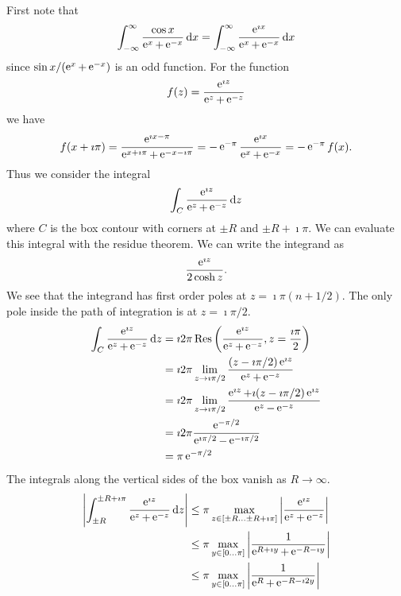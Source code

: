 {%
\begin{Solution}
  \label{solution cos x / (e x + e -x)}
  First note that 
  \[
  \int_{-\infty}^\infty \frac{\cos x}{\mathop{\mathrm{e}}\nolimits^x + \mathop{\mathrm{e}}\nolimits^{-x} } \,\mathrm{d} x 
  = \int_{-\infty}^\infty \frac{ \mathop{\mathrm{e}}\nolimits^{\imath x} }{\mathop{\mathrm{e}}\nolimits^x + \mathop{\mathrm{e}}\nolimits^{-x} } \,\mathrm{d} x
  \]
  since $\sin x / (\mathop{\mathrm{e}}\nolimits^x + \mathop{\mathrm{e}}\nolimits^{-x})$ is an odd function.  For the function
  \[
  f(z) = \frac{ \mathop{\mathrm{e}}\nolimits^{\imath z} }{ \mathop{\mathrm{e}}\nolimits^{z} + \mathop{\mathrm{e}}\nolimits^{-z} }
  \]
  we have
  \[
  f(x + \imath \pi) = \frac{ \mathop{\mathrm{e}}\nolimits^{\imath x - \pi} }{ \mathop{\mathrm{e}}\nolimits^{x + \imath \pi} + \mathop{\mathrm{e}}\nolimits^{-x - \imath \pi} }
  = - \mathop{\mathrm{e}}\nolimits^{- \pi} \frac{ \mathop{\mathrm{e}}\nolimits^{\imath x} }{ \mathop{\mathrm{e}}\nolimits^x + \mathop{\mathrm{e}}\nolimits^{-x} }
  = - \mathop{\mathrm{e}}\nolimits^{- \pi} f(x).
  \]
  Thus we consider the integral
  \[
  \int_C \frac{ \mathop{\mathrm{e}}\nolimits^{\imath z} }{ \mathop{\mathrm{e}}\nolimits^{z} + \mathop{\mathrm{e}}\nolimits^{-z} } \,\mathrm{d} z
  \]
  where $C$ is the box contour with corners at $\pm R$ and $\pm R + \imath \pi$.
  We can evaluate this integral with the residue theorem.
  We can write the integrand as
  \[
  \frac{ \mathop{\mathrm{e}}\nolimits^{\imath z} }{ 2 \cosh z }.
  \]
  We see that the integrand has first order poles at $z = \imath \pi (n + 1/2)$. 
  The only pole inside the path of integration is at $z = \imath \pi / 2$.
  \begin{align*}
    \int_C \frac{ \mathop{\mathrm{e}}\nolimits^{\imath z} }{ \mathop{\mathrm{e}}\nolimits^{z} + \mathop{\mathrm{e}}\nolimits^{-z} } \,\mathrm{d} z
    &= \imath 2 \pi \mathop{\mathrm{Res}}\nolimits \left( \frac{ \mathop{\mathrm{e}}\nolimits^{\imath z} }{ \mathop{\mathrm{e}}\nolimits^{z} + \mathop{\mathrm{e}}\nolimits^{-z} },
      z = \frac{ \imath \pi }{ 2 } \right) \\
    &= \imath 2 \pi \lim_{z \to \imath \pi / 2}
    \frac{ (z - \imath \pi / 2) \mathop{\mathrm{e}}\nolimits^{\imath z} }{ \mathop{\mathrm{e}}\nolimits^{z} + \mathop{\mathrm{e}}\nolimits^{-z} } \\
    &= \imath 2 \pi \lim_{z \to \imath \pi / 2}
    \frac{ \mathop{\mathrm{e}}\nolimits^{\imath z} + \imath (z - \imath \pi / 2) \mathop{\mathrm{e}}\nolimits^{\imath z} }
    { \mathop{\mathrm{e}}\nolimits^{z} - \mathop{\mathrm{e}}\nolimits^{-z} } \\
    &= \imath 2 \pi \frac{ \mathop{\mathrm{e}}\nolimits^{-\pi / 2} }{ \mathop{\mathrm{e}}\nolimits^{\imath \pi/2} - \mathop{\mathrm{e}}\nolimits^{-\imath \pi/2} } \\
    &= \pi \mathop{\mathrm{e}}\nolimits^{-\pi / 2}
  \end{align*}
  The integrals along the vertical sides of the box vanish as $R \to \infty$.
  \begin{align*}
    \left| \int_{\pm R}^{\pm R + \imath \pi} \frac{ \e^{\imath z} }{ \e^{z} + \e^{-z} } 
      \,\dd z \right|
    &\leq \pi \max_{z \in [\pm R \ldots \pm R + \imath \pi] }
    \left| \frac{ \e^{\imath z} }{ \e^{z} + \e^{-z} } \right| \\
    &\leq \pi \max_{y \in [0 \ldots \pi] }
    \left| \frac{ 1 }{ \e^{R + \imath y} + \e^{-R - \imath y} } \right| \\
    &\leq \pi \max_{y \in [0 \ldots \pi] }
    \left| \frac{ 1 }{ \e^{R} + \e^{-R - \imath 2 y} } \right| \\

\end{align*}
\end{Solution}}
